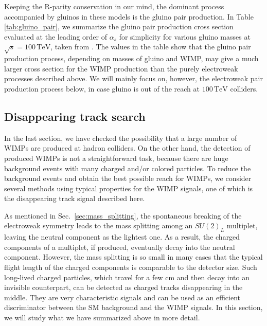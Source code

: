 \documentclass[12pt,twoside,book]{article}
\begin{document}
Keeping the R-parity conservation in our mind, the dominant process accompanied by gluinos in these models is the gluino pair production.
In Table \ref{tab:gluino_pair}, we summarize the gluino pair production cross section evaluated at the leading order of $\alpha_s$ for simplicity for various gluino masses at $\sqrt{s} = 100\,\mathrm{TeV}$, taken from \cite{Asai:2019wst}.
The values in the table show that the gluino pair production process, depending on masses of gluino and WIMP, may give a much larger cross section for the WIMP production than the purely electroweak processes described above.
We will mainly focus on, however, the electroweak pair production process below, in case gluino is out of the reach at $100\,\mathrm{TeV}$ colliders.


\subsection{Disappearing track search}
\label{sec:disappearing_track}

In the last section, we have checked the possibility that a large number of WIMPs are produced at hadron colliders.
On the other hand, the detection of produced WIMPs is not a straightforward task, because there are huge background events with many charged and/or colored particles.
To reduce the background events and obtain the best possible reach for WIMPs, we consider several methods using typical properties for the WIMP signals, one of which is the disappearing track signal described here.

As mentioned in Sec.~\ref{sec:mass_splitting}, the spontaneous breaking of the electroweak symmetry leads to the mass splitting among an $SU(2)_L$ multiplet, leaving the neutral component as the lightest one.
As a result, the charged components of a multiplet, if produced, eventually decay into the neutral component.
However, the mass splitting is so small in many cases that the typical flight length of the charged components is comparable to the detector size.
Such long-lived charged particles, which travel for a few $\mathrm{cm}$ and then decay into an invisible counterpart, can be detected as charged tracks disappearing in the middle.
They are very characteristic signals and can be used as an efficient discriminator between the SM background and the WIMP signals.
In this section, we will study what we have summarized above in more detail.
\end{document}

